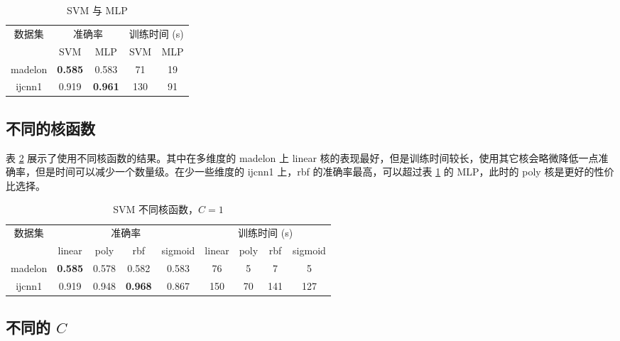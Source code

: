     \begin{table}[ht]
        \centering
        \caption{SVM 与 MLP}\label{tab:mlp}
        \begin{tabular}{ccccc}
            \toprule
            \multirow{2}{*}{数据集} & \multicolumn{2}{c}{准确率} & \multicolumn{2}{c}{训练时间 (s)} \\
            \cmidrule(r){2-3}\cmidrule(l){4-5}
            & SVM & MLP & SVM & MLP \\
            \midrule
            madelon & \textbf{0.585} & 0.583 & 71 & 19 \\
            ijcnn1 & 0.919 & \textbf{0.961} & 130 & 91 \\
            \bottomrule
        \end{tabular}
    \end{table}

    \subsection{不同的核函数}

    表 \ref{tab:kernel} 展示了使用不同核函数的结果。其中在多维度的 madelon 上 linear 核的表现最好，但是训练时间较长，使用其它核会略微降低一点准确率，但是时间可以减少一个数量级。在少一些维度的 ijcnn1 上，rbf 的准确率最高，可以超过表 \ref{tab:mlp} 的 MLP，此时的 poly 核是更好的性价比选择。

    \begin{table}[ht]
        \centering
        \caption{SVM 不同核函数，$C=1$}\label{tab:kernel}
        \begin{tabular}{ccccccccc}
            \toprule
            \multirow{2}{*}{数据集} & \multicolumn{4}{c}{准确率} & \multicolumn{4}{c}{训练时间 (s)} \\
            \cmidrule(r){2-5}\cmidrule(l){6-9}
            & linear & poly & rbf & sigmoid & linear & poly & rbf & sigmoid \\
            \midrule
            madelon & \textbf{0.585} & 0.578 & 0.582 & 0.583 & 76 & 5  & 7 & 5 \\
            ijcnn1 & 0.919 & 0.948 & \textbf{0.968} & 0.867 & 150 & 70 & 141 & 127 \\
            \bottomrule
        \end{tabular}
    \end{table}

    \subsection{不同的 $C$}

